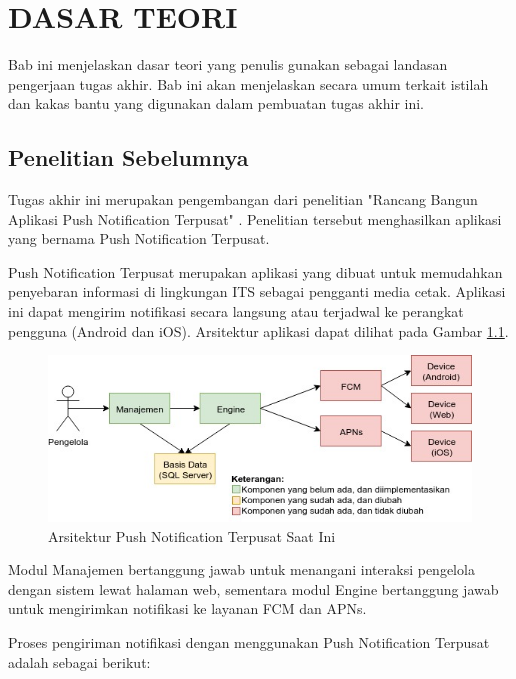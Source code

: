 \chapter{DASAR TEORI}
\par Bab ini menjelaskan dasar teori yang penulis gunakan sebagai landasan pengerjaan tugas akhir. Bab ini akan menjelaskan secara umum terkait istilah dan kakas bantu yang digunakan dalam pembuatan tugas akhir ini.

\section{Penelitian Sebelumnya}
\par Tugas akhir ini merupakan pengembangan dari penelitian "Rancang Bangun Aplikasi Push Notification Terpusat" \cite{application-thesis}. Penelitian tersebut menghasilkan aplikasi yang bernama Push Notification Terpusat.
\par Push Notification Terpusat merupakan aplikasi yang dibuat untuk memudahkan penyebaran informasi di lingkungan ITS sebagai pengganti media cetak. Aplikasi ini dapat mengirim notifikasi secara langsung atau terjadwal ke perangkat pengguna (Android dan iOS). Arsitektur aplikasi dapat dilihat pada Gambar \ref{img:arsitektur-pnt_lama}.
\begin{figure}[H]
	\centering\includegraphics[width=1\textwidth]{bab2/img/arsitektur-push_notification_terpusat_lama.jpg}
	\caption{Arsitektur Push Notification Terpusat Saat Ini}
	\label{img:arsitektur-pnt_lama}
\end{figure}
\par Modul Manajemen bertanggung jawab untuk menangani interaksi pengelola dengan sistem lewat halaman web, sementara modul Engine bertanggung jawab untuk mengirimkan notifikasi ke layanan FCM dan APNs.
\par Proses pengiriman notifikasi dengan menggunakan Push Notification Terpusat adalah sebagai berikut:
